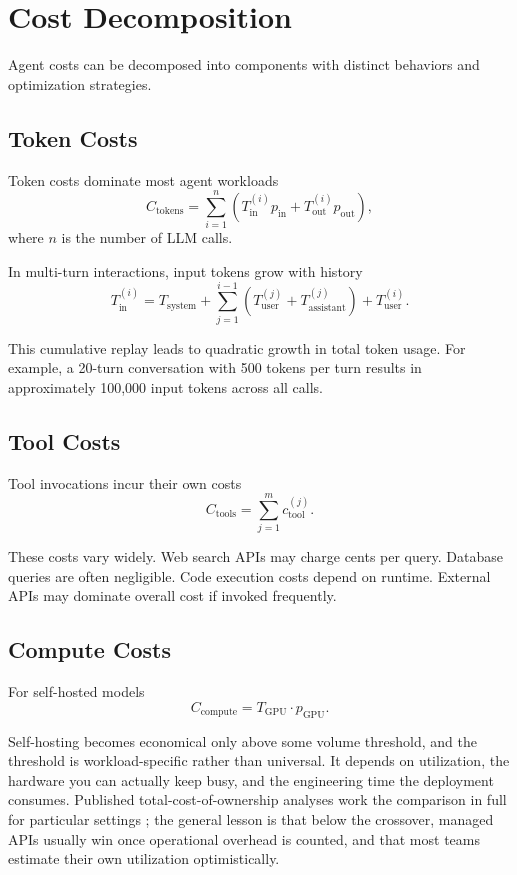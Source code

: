 \section{Cost Decomposition}

Agent costs can be decomposed into components with distinct behaviors and optimization strategies.

\subsection{Token Costs}

Token costs dominate most agent workloads
\[
C_{\text{tokens}} =
\sum_{i=1}^{n}
\left(
T_{\text{in}}^{(i)} p_{\text{in}}
+
T_{\text{out}}^{(i)} p_{\text{out}}
\right),
\]
where $n$ is the number of LLM calls.

In multi-turn interactions, input tokens grow with history
\[
T_{\text{in}}^{(i)} =
T_{\text{system}}
+
\sum_{j=1}^{i-1}
\left(
T_{\text{user}}^{(j)} + T_{\text{assistant}}^{(j)}
\right)
+
T_{\text{user}}^{(i)}.
\]

This cumulative replay leads to quadratic growth in total token usage. For example, a 20-turn conversation with 500 tokens per turn results in approximately 100,000 input tokens across all calls.

\subsection{Tool Costs}

Tool invocations incur their own costs
\[
C_{\text{tools}} = \sum_{j=1}^{m} c_{\text{tool}}^{(j)}.
\]

These costs vary widely. Web search APIs may charge cents per query. Database queries are often negligible. Code execution costs depend on runtime. External APIs may dominate overall cost if invoked frequently.

\subsection{Compute Costs}

For self-hosted models
\[
C_{\text{compute}} = T_{\text{GPU}} \cdot p_{\text{GPU}}.
\]

Self-hosting becomes economical only above some volume threshold, and the threshold is workload-specific rather than universal. It depends on utilization, the hardware you can actually keep busy, and the engineering time the deployment consumes. Published total-cost-of-ownership analyses work the comparison in full for particular settings \cite{tcoanalysis2024}; the general lesson is that below the crossover, managed APIs usually win once operational overhead is counted, and that most teams estimate their own utilization optimistically.

